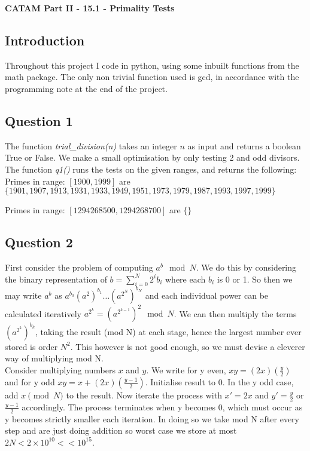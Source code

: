 \documentclass[10pt,a4paper]{report}
\begin{document}
\textbf{CATAM Part II - 15.1 - Primality Tests}

\subsection*{Introduction}

Throughout this project I code in python, using some inbuilt functions from the math package. The only non trivial function used is gcd, in accordance with the programming note at the end of the project.

\subsection*{Question 1}


The function \textit{trial\_division(n)} takes an integer $n$ as input and returns a boolean True or False. We make a small optimisation by only testing 2 and odd divisors. The function \textit{q1()} runs the tests on the given ranges, and returns the following:\\

Primes in range: $[1900, 1999]$ are  $\{1901, 1907, 1913, 1931, 1933   ,1949, 1951, 1973, 1979, 1987, 1993, 1997, 1999\}$

Primes in range: $ [1294268500, 1294268700]$ are $\{\}$

\subsection*{Question 2}

First consider the problem of computing $a^b \mod{N}$. We do this by considering the binary representation of $b = \sum_{i=0}^N 2^i b_i$ where each $b_i$ is 0 or 1. So then we may write $a^b$ as $a^{b_0} (a^2)^{b_1} \ldots (a^{2^N})^{b_N}$ and each individual power  can be calculated iteratively $a^{2^k} =  (a^{2^{k-1}})^2  \mod N$. We can then multiply the terms $(a^{2^k})^{b_k}$, taking the result (mod N) at each stage, hence the largest number ever stored is order $N^2$. This however is not good enough, so we must devise a cleverer way of multiplying mod N.\\

Consider multiplying numbers $x$ and $y$. We write for y even, $xy = (2x)(\frac{y}{2})$ and for y odd $xy = x+ (2x)(\frac{y-1}{2})$. Initialise result to 0. In the y odd case, add $x \pmod{N}$ to the result. Now iterate the process with $x'=2x$ and $y'=\frac{y}{2}$ or $\frac{y-1}{2}$ accordingly. The process terminates when y becomes 0, which must occur as y becomes strictly smaller each iteration. In doing so we take mod N after every step and are just doing addition so worst case we store at most $2N < 2\times 10^{10} << 10^{15}$.\\
\end{document}
